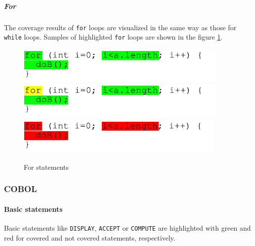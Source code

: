 \subparagraph{For}
The coverage results of \texttt{for} loops are visualized in the same way as those for \texttt{while} loops. Samples of highlighted \texttt{for} loops are shown in the figure \ref{ui_fg:For statements}.
\begin{figure}[hbt]
 \hfill
 \includegraphics[]{images/Source_Code_Highlighting/for/for_green}
 \hfill
 \includegraphics[]{images/Source_Code_Highlighting/for/for_yellow}
 \hfill
 \newline
 \centering
 \includegraphics[]{images/Source_Code_Highlighting/for/for_red}
 \caption{For statements}
 \label{ui_fg:For statements}
\end{figure}
\par

\subsubsection{COBOL}
\paragraph{Basic statements}
Basic statements like \texttt{DISPLAY}, \texttt{ACCEPT} or \texttt{COMPUTE} are highlighted with green and red for covered and not covered statements, respectively.

